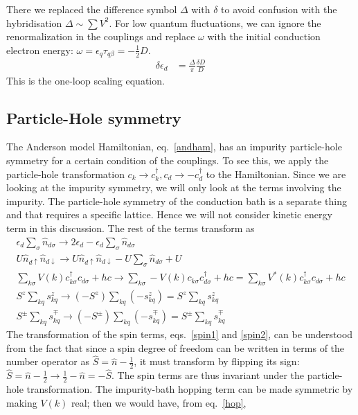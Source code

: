 \documentclass[twoside,11pt]{report}
\numberwithin{equation}{section}
\begin{document}
There we replaced the difference symbol \(\Delta\) with \(\delta\) to avoid confusion with the hybridisation \(\Delta \sim \sum V^2\). For low quantum fluctuations, we can ignore the renormalization in the couplings and replace \(\omega\) with the initial conduction electron energy: \(\omega = \epsilon_q\tau_{q\beta} = -\frac{1}{2} D\).
\begin{equation}\begin{aligned}
\delta \epsilon_d &= \frac{\Delta}{\pi}\frac{\delta D}{D}
\end{aligned}\end{equation}
This is the one-loop scaling equation.
\subsection{Particle-Hole symmetry}
The Anderson model Hamiltonian, eq.~\ref{andham}, has an impurity particle-hole symmetry for a certain condition of the couplings. To see this, we apply the particle-hole transformation \(c_k \to c^\dagger_k, c_d \to -c^\dagger_d\) to the Hamiltonian. Since we are looking at the impurity symmetry, we will only look at the terms involving the impurity. The particle-hole symmetry of the conduction bath is a separate thing and that requires a specific lattice. Hence we will not consider kinetic energy term in this discussion. The rest of the terms transform as
\begin{gather}
    \epsilon_d \sum_\sigma \hat n_{d\sigma} \to 2\epsilon_d - \epsilon_d \sum_\sigma \hat n_{d\sigma}\label{imp1}\\
U \hat n_{d\uparrow}\hat n_{d\downarrow} \to U \hat n_{d\uparrow}\hat n_{d\downarrow} - U\sum_\sigma \hat n_{d\sigma} + U\label{imp2}\\
\sum_{k\sigma}V(k)c^\dagger_{k\sigma}c_{d\sigma} + hc \to \sum_{k\sigma}-V(k)c_{k\sigma}c^\dagger_{d\sigma} + hc = \sum_{k\sigma}V^*(k)c^\dagger_{k\sigma}c_{d\sigma} + hc \label{hop}\\
S^z\sum_{kq}s^z_{kq} \to \left(-S^z\right)\sum_{kq}\left(-s^z_{kq}\right) = S^z\sum_{kq}s^z_{kq}\label{spin1}\\
S^{\pm}\sum_{kq}s^{\mp}_{kq} \to \left(-S^{\pm}\right)\sum_{kq}\left(-s^{\mp}_{kq}\right) = S^{\pm}\sum_{kq}s^{\mp}_{kq}\label{spin2}
\end{gather}
The transformation of the spin terms, eqs.~\ref{spin1} and \ref{spin2}, can be understood from the fact that since a spin degree of freedom can be written in terms of the number operator as \(\hat S = \hat n - \frac{1}{2}\), it must transform by flipping its sign: \(\hat S = \hat n - \frac{1}{2} \to \frac{1}{2} - \hat n = -\hat S\). The spin terms are thus invariant under the particle-hole transformation. The impurity-bath hopping term can be made symmetric by making \(V(k)\) real; then we would have, from eq.~\ref{hop},
\end{document}
